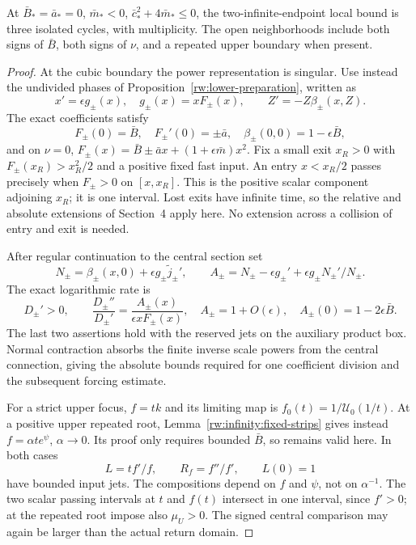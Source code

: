 \begin{proposition}\label{rw:infinity:cubic}
At $\bar B_* =\bar a_*=0$, $\bar m_*<0$,
$\bar c_*^2+4\bar m_*\le0$, the two-infinite-endpoint local bound
is three isolated cycles, with multiplicity. The open neighborhoods
include both signs of $\bar B$, both signs of $\nu$, and a repeated
upper boundary when present.
\end{proposition}
\begin{proof}
At the cubic boundary the power representation is singular.
Use instead the undivided phases of
Proposition~\ref{rw:lower-preparation}, written as
\[
 x'=\epsilon g_\pm(x),\quad g_\pm(x)=xF_\pm(x),\qquad
 Z'=-Z\beta_\pm(x,Z).
\]
The exact coefficients satisfy
\[
 F_\pm(0)=\bar B,\quad F_\pm'(0)=\pm\bar a,
 \quad \beta_\pm(0,0)=1-\epsilon\bar B,
\]
and on $\nu=0$,
$F_\pm(x)=\bar B\pm\bar ax+(1+\epsilon\bar m)x^2$.
Fix a small exit $x_R>0$ with $F_\pm(x_R)>x_R^2/2$ and a
positive fixed fast input. An entry $x<x_R/2$ passes precisely when
$F_\pm>0$ on $[x,x_R]$. This is the positive scalar component
adjoining $x_R$; it is one interval. Lost exits have infinite time,
so the relative and absolute extensions of Section~4 apply here.
No extension across a collision of entry and exit is needed.

After regular continuation to the central section set
\[
 N_\pm=\beta_\pm(x,0)+\epsilon g_\pm\widetilde j_\pm',\qquad
 A_\pm=N_\pm-\epsilon g_\pm'
                    +\epsilon g_\pm N_\pm'/N_\pm.
\]
The exact logarithmic rate is
\begin{equation}\label{rw:infinity:cubic-rate}
 D_\pm'>0,\qquad
 \frac{D_\pm''}{D_\pm'}=\frac{A_\pm(x)}{\epsilon xF_\pm(x)},
 \quad A_\pm=1+O(\epsilon),\quad A_\pm(0)=1-2\epsilon\bar B.
\end{equation}
The last two assertions hold with the reserved jets on the auxiliary
product box. Normal contraction absorbs the finite inverse scale powers
from the central connection, giving the absolute bounds required for
one coefficient division and the subsequent forcing estimate.

For a strict upper focus, $f=tk$ and its limiting map is
$f_0(t)=1/\mathcal U_0(1/t)$. At a positive upper repeated root,
Lemma~\ref{rw:infinity:fixed-strips} gives instead
$f=\alpha te^\psi$, $\alpha\to0$. Its proof only requires bounded
$\bar B$, so remains valid here. In both cases
\[
 L=tf'/f,\qquad R_f=f''/f',\qquad L(0)=1
\]
have bounded input jets. The compositions depend on $f$ and $\psi$,
not on $\alpha^{-1}$. The two scalar passing intervals at $t$ and
$f(t)$ intersect in one interval, since $f'>0$; at the repeated
root impose also $\mu_U>0$. The signed central comparison may again
be larger than the actual return domain.


\end{proof}
